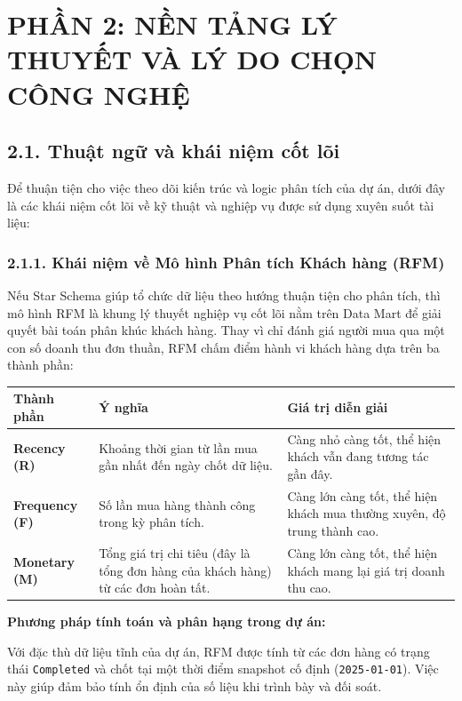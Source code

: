 \documentclass[12pt,a4paper]{article}
\newcommand{\code}[1]{\texttt{#1}}
\begin{document}
\section{PHẦN 2: NỀN TẢNG LÝ THUYẾT VÀ LÝ DO CHỌN CÔNG NGHỆ}

\subsection{2.1. Thuật ngữ và khái niệm cốt lõi}

Để thuận tiện cho việc theo dõi kiến trúc và logic phân tích của dự án, dưới đây là các khái niệm cốt lõi về kỹ thuật và nghiệp vụ được sử dụng xuyên suốt tài liệu:

\subsubsection{2.1.1. Khái niệm về Mô hình Phân tích Khách hàng (RFM)}

Nếu Star Schema giúp tổ chức dữ liệu theo hướng thuận tiện cho phân tích, thì mô hình RFM là khung lý thuyết nghiệp vụ cốt lõi nằm trên Data Mart để giải quyết bài toán phân khúc khách hàng. Thay vì chỉ đánh giá người mua qua một con số doanh thu đơn thuần, RFM chấm điểm hành vi khách hàng dựa trên ba thành phần:

\begin{table}[H]
\centering
\begin{tabularx}{\textwidth}{|p{}|Y|Y|}
\hline
\textbf{Thành phần} & \textbf{Ý nghĩa} & \textbf{Giá trị diễn giải} \\
\hline
\textbf{Recency (R)} & Khoảng thời gian từ lần mua gần nhất đến ngày chốt dữ liệu. & Càng nhỏ càng tốt, thể hiện khách vẫn đang tương tác gần đây. \\
\hline
\textbf{Frequency (F)} & Số lần mua hàng thành công trong kỳ phân tích. & Càng lớn càng tốt, thể hiện khách mua thường xuyên, độ trung thành cao. \\
\hline
\textbf{Monetary (M)} & Tổng giá trị chi tiêu (đây là tổng đơn hàng của khách hàng) từ các đơn hoàn tất. & Càng lớn càng tốt, thể hiện khách mang lại giá trị doanh thu cao. \\
\hline
\end{tabularx}
\end{table}

\textbf{Phương pháp tính toán và phân hạng trong dự án:}

Với đặc thù dữ liệu tĩnh của dự án, RFM được tính từ các đơn hàng có trạng thái \code{Completed} và chốt tại một thời điểm snapshot cố định (\code{2025-01-01}). Việc này giúp đảm bảo tính ổn định của số liệu khi trình bày và đối soát.
\end{document}
